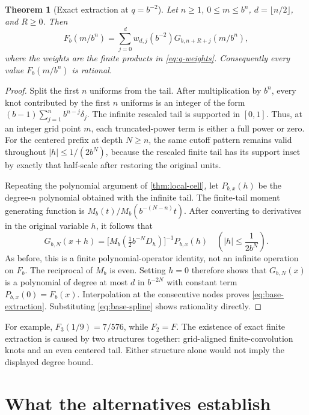 \documentclass[11pt,a4paper]{article}
\numberwithin{equation}{section}
\newtheorem{theorem}{Theorem}[section]
\theoremstyle{definition}
\theoremstyle{remark}
\begin{document}
\begin{theorem}[Exact extraction at $q=b^{-2}$]
\label{thm:base-extraction}
Let $n\ge1$, $0\le m\le b^n$, $d=\lfloor n/2\rfloor$, and $R\ge0$. Then
\begin{equation}
 \boxed{\displaystyle
 F_b(m/b^n)=\sum_{j=0}^{d}w_{d,j}(b^{-2})
               G_{b,n+R+j}(m/b^n),}
 \label{eq:base-extraction}
\end{equation}
where the weights are the finite products in \cref{eq:q-weights}. Consequently every value $F_b(m/b^n)$ is rational.
\end{theorem}
\begin{proof}
Split the first $n$ uniforms from the tail. After multiplication by $b^n$, every knot contributed by the first $n$ uniforms is an integer of the form
$(b-1)\sum_{j=1}^{n}b^{n-j}\delta_j$. The infinite rescaled tail is supported in $[0,1]$. Thus, at an integer grid point $m$, each truncated-power term is either a full power or zero. For the centered prefix at depth $N\ge n$, the same cutoff pattern remains valid throughout $|h|\le1/(2b^N)$, because the rescaled finite tail has its support inset by exactly that half-scale after restoring the original units.

Repeating the polynomial argument of \cref{thm:local-cell}, let $P_{b,x}(h)$ be the degree-$n$ polynomial obtained with the infinite tail. The finite-tail moment generating function is $M_b(t)/M_b(b^{-(N-n)}t)$. After converting to derivatives in the original variable $h$, it follows that
\[
 G_{b,N}(x+h)=
 \bigl[M_b(\tfrac12b^{-N}D_h)\bigr]^{-1}P_{b,x}(h)
 \quad\left(|h|\le\frac1{2b^N}\right).
\]
As before, this is a finite polynomial-operator identity, not an infinite operation on $F_b$. The reciprocal of $M_b$ is even. Setting $h=0$ therefore shows that $G_{b,N}(x)$ is a polynomial of degree at most $d$ in $b^{-2N}$ with constant term $P_{b,x}(0)=F_b(x)$. Interpolation at the consecutive nodes proves \cref{eq:base-extraction}. Substituting \cref{eq:base-spline} shows rationality directly.
\end{proof}
For example, $F_3(1/9)=7/576$, while $F_2=F$. The existence of exact finite extraction is caused by two structures together: grid-aligned finite-convolution knots and an even centered tail. Either structure alone would not imply the displayed degree bound.

\section{What the alternatives establish}
\label{sec:conclusion}
\end{document}
